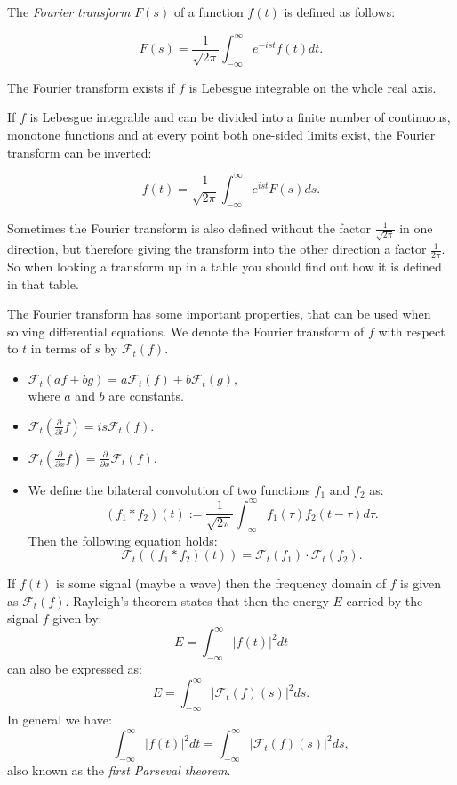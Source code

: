 \documentclass[12pt]{article}
\begin{document}
The \emph{Fourier transform} $F(s)$ of a function $f(t)$ is defined as follows:

$$ F(s)=\frac{1}{\sqrt{2\pi}}\int_{-\infty}^{\infty}e^{-ist}f(t)dt.$$

The Fourier transform exists if $f$ is Lebesgue integrable on the whole real axis.

If $f$ is Lebesgue integrable and can be divided into a finite number of continuous, monotone functions and at every point both one-sided limits exist, the Fourier transform can be inverted:

$$f(t)=\frac{1}{\sqrt{2\pi}}\int_{-\infty}^{\infty}e^{ist}F(s)ds.$$

Sometimes the Fourier transform is also defined without the factor $\frac{1}{\sqrt{2\pi}}$ in one direction, but therefore giving the transform into the other direction a factor $\frac{1}{2\pi}$. So when looking a transform up in a table you should find out how it is defined in that table.

The Fourier transform has some important properties, that can be used when solving differential equations. We denote the Fourier transform of $f$ with respect to $t$ in terms of $s$ by $\mathcal{F}_t(f)$.
\begin{itemize}
\item $\mathcal{F}_t(af+bg)=a\mathcal{F}_t(f)+b\mathcal{F}_t(g),$\\
where $a$ and $b$ are constants.
\item $\mathcal{F}_t\left(\frac{\partial}{\partial t}f\right)=is\mathcal{F}_t(f).$
\item $\mathcal{F}_t\left(\frac{\partial}{\partial x}f\right)=\frac{\partial}{\partial x}\mathcal{F}_t(f).$
\item We define the bilateral convolution of two functions $f_1$ and $f_2$ as: 
$$(f_1\ast f_2)(t):=\frac{1}{\sqrt{2\pi}}\int_{-\infty}^{\infty}f_1(\tau)f_2(t-\tau)d\tau.$$
Then the following equation holds:
$$\mathcal{F}_t((f_1\ast f_2)(t))=\mathcal{F}_t(f_1)\cdot\mathcal{F}_t(f_2).$$
\end{itemize}
If $f(t)$ is some signal (maybe a  wave) then the frequency domain of $f$ is given as $\mathcal{F}_t(f)$. Rayleigh's theorem states that then the energy $E$ carried by the signal $f$ given by:
$$E=\int_{-\infty}^{\infty}|f(t)|^2dt$$
can also be expressed as:
$$E=\int_{-\infty}^{\infty}|\mathcal{F}_t(f)(s)|^2ds.$$
In general we have:
$$\int_{-\infty}^{\infty}|f(t)|^2dt=\int_{-\infty}^{\infty}|\mathcal{F}_t(f)(s)|^2ds,$$
also known as the \emph{first Parseval theorem}.
\end{document}
